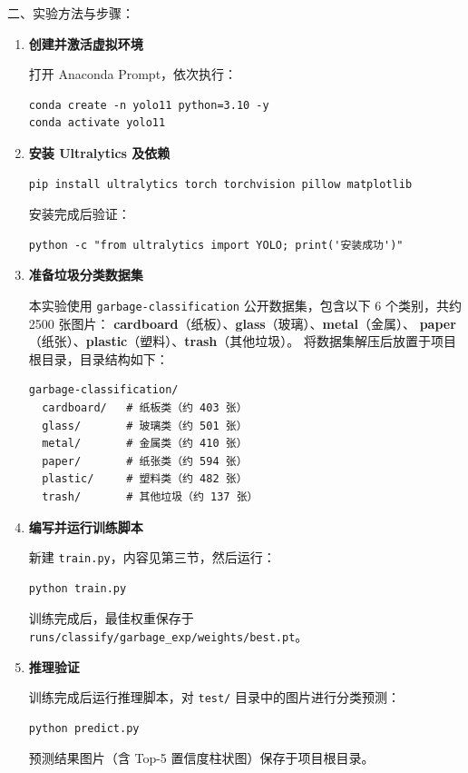 \documentclass[12pt, a4paper]{article}
\begin{document}
\begin{labbox}{二、实验方法与步骤：}{}

\begin{enumerate}[leftmargin=2em, itemsep=0.5em]

    \item \textbf{创建并激活虚拟环境}

    打开 Anaconda Prompt，依次执行：
\begin{lstlisting}
conda create -n yolo11 python=3.10 -y
conda activate yolo11
\end{lstlisting}

    \item \textbf{安装 Ultralytics 及依赖}
\begin{lstlisting}
pip install ultralytics torch torchvision pillow matplotlib
\end{lstlisting}

    安装完成后验证：
\begin{lstlisting}
python -c "from ultralytics import YOLO; print('安装成功')"
\end{lstlisting}

    \item \textbf{准备垃圾分类数据集}

    本实验使用 \texttt{garbage-classification} 公开数据集，包含以下 6 个类别，共约 2500 张图片：
    \textbf{cardboard}（纸板）、\textbf{glass}（玻璃）、\textbf{metal}（金属）、
    \textbf{paper}（纸张）、\textbf{plastic}（塑料）、\textbf{trash}（其他垃圾）。
    将数据集解压后放置于项目根目录，目录结构如下：
\begin{lstlisting}
garbage-classification/
  cardboard/   # 纸板类（约 403 张）
  glass/       # 玻璃类（约 501 张）
  metal/       # 金属类（约 410 张）
  paper/       # 纸张类（约 594 张）
  plastic/     # 塑料类（约 482 张）
  trash/       # 其他垃圾（约 137 张）
\end{lstlisting}

    \item \textbf{编写并运行训练脚本}

    新建 \texttt{train.py}，内容见第三节，然后运行：
\begin{lstlisting}
python train.py
\end{lstlisting}

    训练完成后，最佳权重保存于 \texttt{runs/classify/garbage\_exp/weights/best.pt}。

    \item \textbf{推理验证}

    训练完成后运行推理脚本，对 \texttt{test/} 目录中的图片进行分类预测：
\begin{lstlisting}
python predict.py
\end{lstlisting}

    预测结果图片（含 Top-5 置信度柱状图）保存于项目根目录。

\end{enumerate}

\end{labbox}
\end{document}
